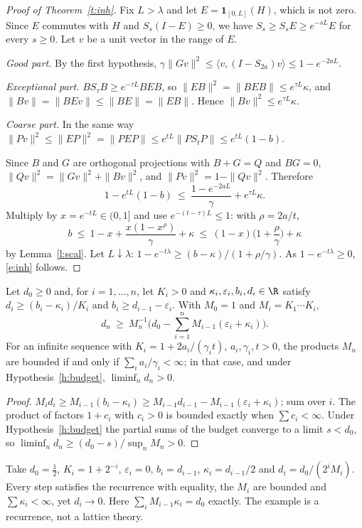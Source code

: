 \begin{proof}[Proof of Theorem~\ref{t:inh}]
Fix $L>\lambda$ and let $E=\mathbf 1_{[0,L]}(H)$, which is not zero. Since $E$ commutes with $H$ and
$S_s(I-E)\ge0$, we have $S_s\ge S_sE\ge e^{-sL}E$ for every $s\ge0$. Let $v$ be a unit vector in the range of
$E$.

\emph{Good part.} By the first hypothesis, $\gamma\|Gv\|^2\le\langle v,(I-S_{2a})v\rangle\le1-e^{-2aL}$.

\emph{Exceptional part.} $BS_\tau B\ge e^{-\tau L}BEB$, so $\|EB\|^2=\|BEB\|\le e^{\tau L}\kappa$, and
$\|Bv\|=\|BEv\|\le\|BE\|=\|EB\|$. Hence $\|Bv\|^2\le e^{\tau L}\kappa$.

\emph{Coarse part.} In the same way $\|Pv\|^2\le\|EP\|^2=\|PEP\|\le e^{tL}\|PS_tP\|\le e^{tL}(1-b)$.

Since $B$ and $G$ are orthogonal projections with $B+G=Q$ and $BG=0$, $\|Qv\|^2=\|Gv\|^2+\|Bv\|^2$, and
$\|Pv\|^2=1-\|Qv\|^2$. Therefore
\[
1-e^{tL}(1-b)\ \le\ \frac{1-e^{-2aL}}{\gamma}+e^{\tau L}\kappa .
\]
Multiply by $x=e^{-tL}\in(0,1]$ and use $e^{-(t-\tau)L}\le1$: with $\rho=2a/t$,
\[
b\ \le\ 1-x+\frac{x(1-x^{\rho})}{\gamma}+\kappa\ \le\ (1-x)\Big(1+\frac{\rho}{\gamma}\Big)+\kappa
\]
by Lemma~\ref{l:scal}. Let $L\downarrow\lambda$: $1-e^{-t\lambda}\ge(b-\kappa)/(1+\rho/\gamma)$. As
$1-e^{-t\lambda}\ge0$, \eqref{e:inh} follows.
\end{proof}

\begin{corollary}[Accumulation]\label{c:acc}
Let $d_0\ge0$ and, for $i=1,\dots,n$, let $K_i>0$ and $\kappa_i,\varepsilon_i,b_i,d_i\in\R$ satisfy
$d_i\ge(b_i-\kappa_i)/K_i$ and $b_i\ge d_{i-1}-\varepsilon_i$. With $M_0=1$ and $M_i=K_1\cdots K_i$,
\[
d_n\ \ge\ M_n^{-1}\Big(d_0-\sum_{i=1}^nM_{i-1}(\varepsilon_i+\kappa_i)\Big).
\]
For an infinite sequence with $K_i=1+2a_i/(\gamma_it)$, $a_i,\gamma_i,t>0$, the products $M_n$ are bounded if
and only if $\sum_ia_i/\gamma_i<\infty$; in that case, and under Hypothesis~\ref{h:budget},
$\liminf_nd_n>0$.
\end{corollary}
\begin{proof}
$M_id_i\ge M_{i-1}(b_i-\kappa_i)\ge M_{i-1}d_{i-1}-M_{i-1}(\varepsilon_i+\kappa_i)$; sum over $i$. The product of
factors $1+c_i$ with $c_i>0$ is bounded exactly when $\sum c_i<\infty$. Under Hypothesis~\ref{h:budget} the
partial sums of the budget converge to a limit $s<d_0$, so $\liminf_nd_n\ge(d_0-s)/\sup_nM_n>0$.
\end{proof}

\begin{remark}\label{r:budget}
Take $d_0=\tfrac12$, $K_i=1+2^{-i}$, $\varepsilon_i=0$, $b_i=d_{i-1}$, $\kappa_i=d_{i-1}/2$ and
$d_i=d_0/(2^iM_i)$. Every step satisfies the recurrence with equality, the $M_i$ are bounded and
$\sum\kappa_i<\infty$, yet $d_i\to0$. Here $\sum_iM_{i-1}\kappa_i=d_0$ exactly. The example is a recurrence,
not a lattice theory.
\end{remark}

